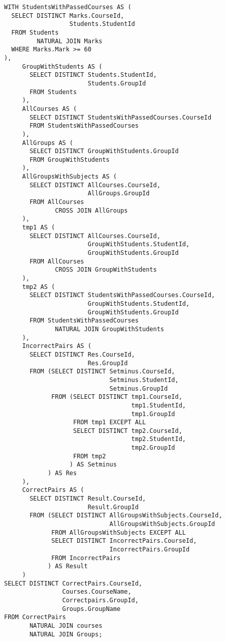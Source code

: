 \documentclass{article}
\begin{document}
\begin{verbatim}
WITH StudentsWithPassedCourses AS (
  SELECT DISTINCT Marks.CourseId,
                  Students.StudentId
  FROM Students
         NATURAL JOIN Marks
  WHERE Marks.Mark >= 60
),
     GroupWithStudents AS (
       SELECT DISTINCT Students.StudentId,
                       Students.GroupId
       FROM Students
     ),
     AllCourses AS (
       SELECT DISTINCT StudentsWithPassedCourses.CourseId
       FROM StudentsWithPassedCourses
     ),
     AllGroups AS (
       SELECT DISTINCT GroupWithStudents.GroupId
       FROM GroupWithStudents
     ),
     AllGroupsWithSubjects AS (
       SELECT DISTINCT AllCourses.CourseId,
                       AllGroups.GroupId
       FROM AllCourses
              CROSS JOIN AllGroups
     ),
     tmp1 AS (
       SELECT DISTINCT AllCourses.CourseId,
                       GroupWithStudents.StudentId,
                       GroupWithStudents.GroupId
       FROM AllCourses
              CROSS JOIN GroupWithStudents
     ),
     tmp2 AS (
       SELECT DISTINCT StudentsWithPassedCourses.CourseId,
                       GroupWithStudents.StudentId,
                       GroupWithStudents.GroupId
       FROM StudentsWithPassedCourses
              NATURAL JOIN GroupWithStudents
     ),
     IncorrectPairs AS (
       SELECT DISTINCT Res.CourseId,
                       Res.GroupId
       FROM (SELECT DISTINCT Setminus.CourseId,
                             Setminus.StudentId,
                             Setminus.GroupId
             FROM (SELECT DISTINCT tmp1.CourseId,
                                   tmp1.StudentId,
                                   tmp1.GroupId
                   FROM tmp1 EXCEPT ALL
                   SELECT DISTINCT tmp2.CourseId,
                                   tmp2.StudentId,
                                   tmp2.GroupId
                   FROM tmp2
                  ) AS Setminus
            ) AS Res
     ),
     CorrectPairs AS (
       SELECT DISTINCT Result.CourseId,
                       Result.GroupId
       FROM (SELECT DISTINCT AllGroupsWithSubjects.CourseId,
                             AllGroupsWithSubjects.GroupId
             FROM AllGroupsWithSubjects EXCEPT ALL
             SELECT DISTINCT IncorrectPairs.CourseId,
                             IncorrectPairs.GroupId
             FROM IncorrectPairs
            ) AS Result
     )
SELECT DISTINCT CorrectPairs.CourseId,
                Courses.CourseName,
                Correctpairs.GroupId,
                Groups.GroupName
FROM CorrectPairs
       NATURAL JOIN courses
       NATURAL JOIN Groups;
\end{verbatim}
\end{document}
